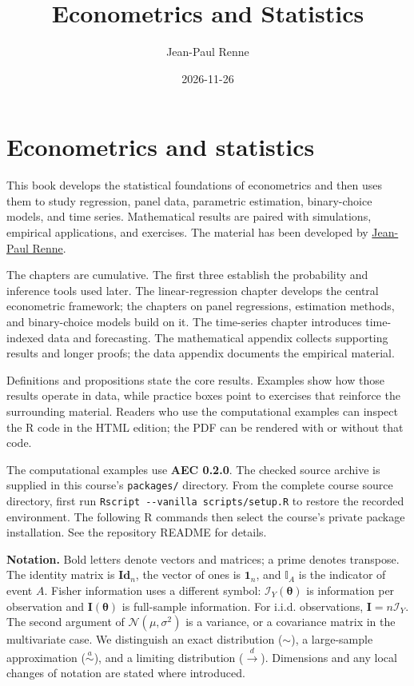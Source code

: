 \documentclass[
  11pt,
]{book}
\title{Econometrics and Statistics}
\author{Jean-Paul Renne}
\date{2026-11-26}
\theoremstyle{definition}
\theoremstyle{definition}
\theoremstyle{definition}
\theoremstyle{definition}
\theoremstyle{remark}
\begin{document}
\maketitle

{
\setcounter{tocdepth}{1}
\tableofcontents
}
\newcommand{\bv}[1]{\mathbf{#1}}

\chapter*{Econometrics and statistics}\label{intro}

This book develops the statistical foundations of econometrics and then uses them to study regression, panel data, parametric estimation, binary-choice models, and time series. Mathematical results are paired with simulations, empirical applications, and exercises. The material has been developed by \href{https://www.jprenne.com}{Jean-Paul Renne}.

The chapters are cumulative. The first three establish the probability and inference tools used later. The linear-regression chapter develops the central econometric framework; the chapters on panel regressions, estimation methods, and binary-choice models build on it. The time-series chapter introduces time-indexed data and forecasting. The mathematical appendix collects supporting results and longer proofs; the data appendix documents the empirical material.

Definitions and propositions state the core results. Examples show how those results operate in data, while practice boxes point to exercises that reinforce the surrounding material. Readers who use the computational examples can inspect the R code in the HTML edition; the PDF can be rendered with or without that code.

The computational examples use \textbf{AEC 0.2.0}. The checked source
archive is supplied in this course's \texttt{packages/} directory. From the complete
course source directory, first run \texttt{Rscript\ -\/-vanilla\ scripts/setup.R} to
restore the recorded environment. The following R commands then select the
course's private package installation. See the repository README for details.

\textbf{Notation.} Bold letters denote vectors and matrices; a prime denotes transpose. The identity matrix is \(\mathbf{Id}_n\), the vector of ones is \(\mathbf{1}_n\), and \(\mathbb{I}_{A}\) is the indicator of event \(A\). Fisher information uses a different symbol: \(\mathcal{I}_Y(\boldsymbol\theta)\) is information per observation and \(\mathbf{I}(\boldsymbol\theta)\) is full-sample information. For i.i.d. observations, \(\mathbf{I}=n\mathcal{I}_Y\). The second argument of \(\mathcal{N}(\mu,\sigma^2)\) is a variance, or a covariance matrix in the multivariate case. We distinguish an exact distribution (\(\sim\)), a large-sample approximation (\(\overset{a}{\sim}\)), and a limiting distribution (\(\overset{d}{\rightarrow}\)). Dimensions and any local changes of notation are stated where introduced.
\end{document}
